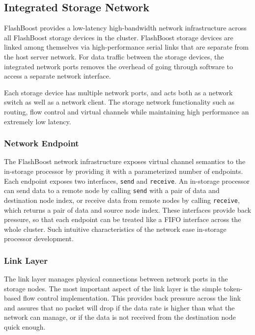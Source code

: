\subsection{Integrated Storage Network}

FlashBoost provides a low-latency high-bandwidth network infrastructure across
all FlashBoost storage devices in the cluster.  FlashBoost storage devices are
linked among themselves via high-performance serial links that are separate from
the host server network. For data traffic between the storage devices, the
integrated network ports removes the overhead of going through software to
access a separate network interface.

Each storage device has multiple network ports, and
acts both as a network switch as well as a network client. The storage network
functionality such as routing, flow control and virtual channels while
maintaining high performance an extremely low latency.

\subsubsection{Network Endpoint}

The FlashBoost network infrastructure exposes virtual channel semantics to the
in-storage processor by providing it with a parameterized number of endpoints. Each endpoint
exposes two interfaces, \texttt{send} and \texttt{receive}. An in-storage
processor can send data to a remote node by calling \texttt{send} with a pair of
data and destination node index, or receive data from remote nodes by calling
\texttt{receive}, which returns a pair of data and source node index. These
interfaces provide back pressure, so that each endpoint can be treated like a FIFO
interface across the whole cluster. Such intuitive characteristics of the
network ease in-storage processor development.

\subsubsection{Link Layer}

The link layer manages physical connections between network ports in the storage
nodes. The most important aspect of the link layer is the simple token-based
flow control implementation. This provides back pressure across the link and
assures that no packet will drop if the data rate is higher than what the
network can manage, or if the data is not received from the destination node
quick enough.

